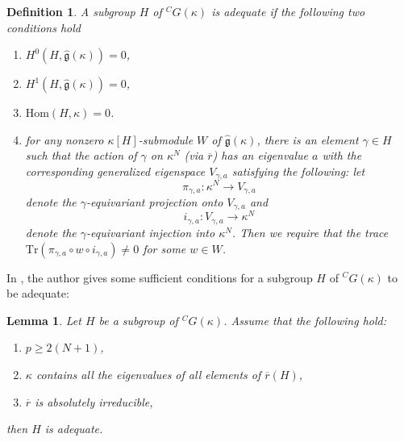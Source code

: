 \documentclass[12pt,oneside,reqno]{amsart}
\theoremstyle{plain}
\newtheorem{definition}[theorem]{Definition}
\newtheorem{lemma}[theorem]{Lemma}
\begin{document}
	\begin{definition}\label{big}
		A subgroup
		$H$ of
		$^CG(\kappa)$ is
		\emph{adequate} if the following two conditions hold
		\begin{enumerate}
			\item 
			$H^0(H,\widehat{\mathfrak{g}}(\kappa))=0$,
			
			\item 
			$H^1(H,
			\widehat{\mathfrak{g}}(\kappa))=0$,
			
			
			
			\item 
			$\mathrm{Hom}(H,\kappa)=0$.
			
			
			\item 
			for any nonzero
			$\kappa[H]$-submodule
			$W$ of
			$\widehat{\mathfrak{g}}(\kappa)$,
			there is an element $\gamma\in H$
			such that the action of $\gamma$ on $\kappa^N$ (via $\overline{r}$)
			has an eigenvalue $a$ with
			the corresponding generalized eigenspace
			$V_{\gamma,a}$ satisfying the following:
			let
			\[
			\pi_{\gamma,a}
			\colon
			\kappa^N
			\rightarrow
			V_{\gamma,a}
			\]
			denote the $\gamma$-equivariant projection onto
			$V_{\gamma,a}$ and
			\[
			i_{\gamma,a}
			\colon
			V_{\gamma,a}
			\rightarrow
			\kappa^N
			\]
			denote the
			$\gamma$-equivariant injection into $\kappa^N$.
			Then
			we require that the trace
			$
			\mathrm{Tr}
			\left(
			\pi_{\gamma,a}\circ w\circ i_{\gamma,a}
			\right)
			\ne
			0$
			for some $w\in W$.
		\end{enumerate}		
	\end{definition}
	
	
	
	In \cite[Theorem 9 of Appendix]{Thorne2012}, the author
	gives
	some sufficient conditions for
	a subgroup $H$ of
	$^CG(\kappa)$
	to be adequate:
	\begin{lemma}\label{when a subgroup is adequate}
		Let $H$ be a subgroup of $^CG(\kappa)$. Assume that the following hold:
		\begin{enumerate}
			\item
			$p\ge 2(N+1)$,
			
			\item 
			$\kappa$
			contains all the eigenvalues of
			all elements of $\overline{r}(H)$,
			
			
			
			\item 
			$\overline{r}$ is absolutely irreducible,
		\end{enumerate}
		then
		$H$
		is adequate.
	\end{lemma}
	
\end{document}

